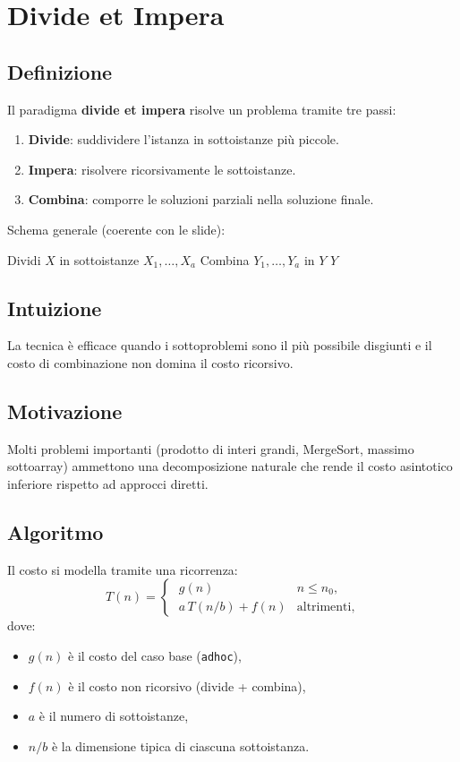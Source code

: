 \section{Divide et Impera}

\subsection{Definizione}
Il paradigma \textbf{divide et impera} risolve un problema tramite tre passi:
\begin{enumerate}
	\item \textbf{Divide}: suddividere l'istanza in sottoistanze più piccole.
	\item \textbf{Impera}: risolvere ricorsivamente le sottoistanze.
	\item \textbf{Combina}: comporre le soluzioni parziali nella soluzione finale.
\end{enumerate}

Schema generale (coerente con le slide): \newline
\begin{algorithm}[H]
	\caption{DivideEtImpera$(X)$}
	Dividi $X$ in sottoistanze $X_1,\dots,X_a$\;
	Combina $Y_1,\dots,Y_a$ in $Y$\;
	\Return $Y$\;
\end{algorithm}

\subsection{Intuizione}
La tecnica è efficace quando i sottoproblemi sono il più possibile disgiunti e il costo di combinazione non domina il costo ricorsivo.

\subsection{Motivazione}
Molti problemi importanti (prodotto di interi grandi, MergeSort, massimo sottoarray) ammettono una decomposizione naturale che rende il costo asintotico inferiore rispetto ad approcci diretti.

\subsection{Algoritmo}
Il costo si modella tramite una ricorrenza:
\[
T(n)=
\begin{cases}
\;g(n) & n\le n_0,\\
\;a\,T(n/b)+f(n) & \text{altrimenti},
\end{cases}
\]
dove:
\begin{itemize}
	\item $g(n)$ è il costo del caso base (\texttt{adhoc}),
	\item $f(n)$ è il costo non ricorsivo (divide + combina),
	\item $a$ è il numero di sottoistanze,
	\item $n/b$ è la dimensione tipica di ciascuna sottoistanza.
\end{itemize}

